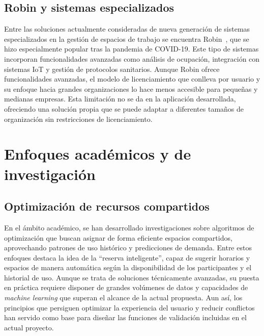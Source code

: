 \subsection{Robin y sistemas especializados}\label{robin-sistemas-especializados}
Entre las soluciones actualmente consideradas de nueva generación de sistemas especializados en la gestión de espacios de trabajo se encuentra Robin~\cite{robin}, que se hizo especialmente popular tras la pandemia de COVID-19. Este tipo de sistemas incorporan funcionalidades avanzadas como análisis de ocupación, integración con sistemas IoT y gestión de protocolos sanitarios.
Aunque Robin ofrece funcionalidades avanzadas, el modelo de licenciamiento que conlleva por usuario y su enfoque hacia grandes organizaciones lo hace menos accesible para pequeñas y medianas empresas. Esta limitación no se da en la aplicación desarrollada, ofreciendo una solución propia que se puede adaptar a diferentes tamaños de organización sin restricciones de licenciamiento.

\section{Enfoques académicos y de investigación}\label{enfoques-academicos-investigacion}
\subsection{Optimización de recursos compartidos}\label{optimizacion-recursos-compartidos}
En el ámbito académico, se han desarrollado investigaciones sobre algoritmos de optimización que buscan asignar de forma eficiente espacios compartidos, aprovechando patrones de uso histórico y predicciones de demanda. Entre estos enfoques destaca la idea de la ``reserva inteligente'', capaz de sugerir horarios y espacios de manera automática según la disponibilidad de los participantes y el historial de uso.
Aunque se trata de soluciones técnicamente avanzadas, su puesta en práctica requiere disponer de grandes volúmenes de datos y capacidades de \emph{machine learning} que superan el alcance de la actual propuesta. Aun así, los principios que persiguen optimizar la experiencia del usuario y reducir conflictos han servido como base para diseñar las funciones de validación incluidas en el actual proyecto.

